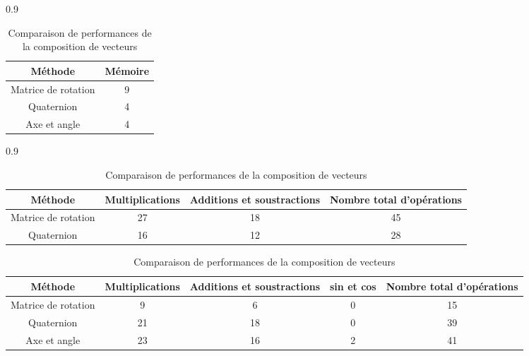 \begin{savenotes}
\begin{table}[ht]
	\centering
		\begin{subtable}[t][4cm]{0.9\linewidth}
			\centering
			\begin{tabular}{cc}
				Méthode & Mémoire \\
				\toprule
				Matrice de rotation & 9 \\
				\midrule
				Quaternion & 4 \\
				\midrule
				Axe et angle & 4\fnoteone \\
				\bottomrule
			\end{tabular}
			\caption{Utilisation en mémoire}
			\label{memoire}
		\end{subtable}
	
	\begin{subtable}[t][4cm]{0.9\linewidth}
		\centering
		\begin{tabular}{cccc}
			Méthode & Multiplications & Additions et soustractions & Nombre total d'opérations \\
			\toprule
			Matrice de rotation & 27 & 18 & 45 \\
			\midrule
			Quaternion & 16 & 12 & 28 \\
			\bottomrule
		\end{tabular}
		\caption{Comparaison de performances de la composition de rotations}
		\label{performances_rotations}
	\end{subtable}

	\begin{subtable}[t][3cm]{\linewidth}
		\centering
		\begin{tabular}{ccccc}
			Méthode & Multiplications & Additions et soustractions & sin et cos & Nombre total d'opérations \\
			\toprule
			Matrice de rotation & 9 & 6 & 0 & 15 \\
			\midrule
			Quaternion & 21 & 18 & 0 & 39 \\
			\midrule
			Axe et angle & 23 & 16 & 2 & 41 \\
			\bottomrule
		\end{tabular}
		\caption{Comparaison de performances de la composition de vecteurs}
		\label{performances_vecteurs}
	\end{subtable}
\end{table}
\end{savenotes}